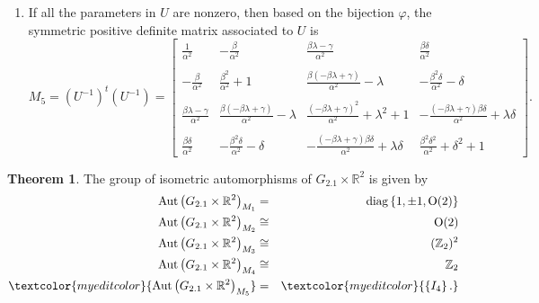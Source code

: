 \documentclass[12pt,a4paper,twoside]{article}
\theoremstyle{definition}
\newtheorem{theorem}{Theorem}[section]
\newcommand{\edit}[1]{\textcolor{myeditcolor}{#1}}
\begin{document}
\begin{enumerate}
$$\begin{bmatrix}
0 & 0 & 0 & 1
\end{bmatrix}.$$
If we choose the metric $U$ where $\beta, \gamma > 0$, $\lambda \neq 0$ and $\edit{\delta = 0}$, we obtain that its group of isometric automorphisms is the same as that of the metric $M_4$.
\item \edit{If all the parameters in $U$ are nonzero, then based on the bijection $\varphi$, the symmetric positive definite matrix associated to $U$ is 
$$M_5 = (U^{-1})^t(U^{-1}) = \begin{bmatrix}
\frac{1}{\alpha^2} & -\frac{\beta}{\alpha^2} & \frac{\beta\lambda - \gamma}{\alpha^2} & \frac{\beta\delta}{\alpha^2} \\
\\
-\frac{\beta}{\alpha^2} & \frac{\beta^2}{\alpha^2} + 1 & \frac{\beta(-\beta\lambda + \gamma)}{\alpha^2} - \lambda & -\frac{\beta^2\delta}{\alpha^2} - \delta \\
\\
\frac{\beta\lambda - \gamma}{\alpha^2} & \frac{\beta(-\beta\lambda + \gamma)}{\alpha^2} - \lambda & \frac{(-\beta\lambda + \gamma)^2}{\alpha^2} + \lambda^2 + 1 & -\frac{(-\beta\lambda + \gamma)\beta\delta}{\alpha^2} + \lambda\delta \\
\\
\frac{\beta\delta}{\alpha^2} & -\frac{\beta^2\delta}{\alpha^2} - \delta & -\frac{(-\beta\lambda + \gamma)\beta\delta}{\alpha^2} + \lambda\delta & \frac{\beta^2\delta^2}{\alpha^2} + \delta^2 + 1
\end{bmatrix}.$$}
\end{enumerate}
\begin{theorem}
The group of isometric automorphisms of $G_{2.1} \times \mathbb{R}^2$ is given by
\begin{eqnarray*}
\operatorname{Aut}\left(G_{2.1} \times \mathbb{R}^2\right)_{M_1}  &=& \operatorname{diag}\left\lbrace 1, \pm1, \operatorname{O}(2)\right\rbrace \\
\operatorname{Aut}\left(G_{2.1} \times \mathbb{R}^2\right)_{M_2}  &\cong& \operatorname{O}(2)\\
\operatorname{Aut}\left(G_{2.1} \times \mathbb{R}^2\right)_{M_3}  &\cong& (\mathbb{Z}_2)^2\\
\operatorname{Aut}\left(G_{2.1} \times \mathbb{R}^2\right)_{M_4}  &\cong& \mathbb{Z}_2\\
\edit{\operatorname{Aut}\left(G_{2.1} \times \mathbb{R}^2\right)_{M_5}}  &=& \edit{\left\lbrace I_4\right\rbrace.}
\end{eqnarray*}
\end{theorem}
\end{document}
